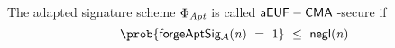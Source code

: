 \begin{definition}[$\cnstaEUFCMA$]
\begin{center}
    \fbox{
    \begin{varwidth}{\textwidth}
        \procedure[linenumbering]{$\procExpForg{\varN}$} {
        \varSet \opAssign \cnstEmptySet \\
        \varKeyPairBob \opFunResult \procSetup{\varSecParam} \\
        (\varMsg \opSeperate \varSecKeyAlice) \opFunResult \cnstAdversary^{\procSignOracle{\cdot}{\cdot}}(\varPubKeyBob) \\
        (\varWit \opSeperate \varStatement) \opFunResult \procGenR{\varSecParam} \\
        (\varSigAlice \opSeperate \varSigBob) \opFunResult \procSignPt{\varMsg}{\varSecKeyAlice}{\varSecKeyBob} \\
        \varSigAptBob \opFunResult \procAptSig{\varSigBob}{\varWit} \\
        \funStar{\varSigAlice} \opFunResult \cnstAdversary^{\procSignOracle{\cdot}{\cdot}}(\varSigBob) \\
        \varSigFin \opFunResult \procFinSig{\funStar{\varSigAlice}}{\varSigBob} \\
        \pcreturn ((\varMsg) \opNotIn \varSet \opAnd \funStar{\varSigAlice} \opNotEq \varSigAlice \opAnd \procVerf{\varMsg}{\varSigFin}{\varPubKeyAlice \opAddPoint \varPubKeyBob})
        }\\[2\baselineskip]
        \procedure[linenumbering]{$\procSignOracle{\varMsg}{\varPubKeyAlice}$} {
        (\varWit \opSeperate \varStatement) \opFunResult \procGenR{\varSecParam} \\
        (\varSigAlice \opSeperate \varSigBob) \opFunResult \procSignPt{\varMsg}{\varSecKeyAlice}{\varSecKeyBob} \\
        \varSigAptBob \opFunResult \procAptSig{\varSigPt}{\varWit} \\
        \varSigFin \opFunResult \procFinSig{\varSigAlice}{\varSigAptBob} \\
        \varSet \opAssign \varSet \opUnion \{\varMsg\} \\
        \pcreturn (\varSigFin \opSeperate \varStatement)
        }\\[2\baselineskip]
    \end{varwidth}
    }
\end{center}
The adapted signature scheme $\Phi_{\mathit{Apt}}$ is called $\cnstaEUFCMA$-secure if
\[ \prob{\procExpForg{\varN} \opEqNoQ 1} \opSmEq \funNegl{\varN} \]
\end{definition}

